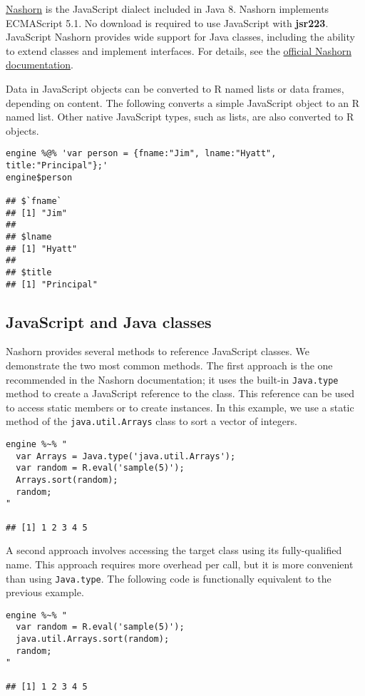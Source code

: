 \documentclass[
article,
11pt, %
a4paper, %
oneside, %
headinclude,footinclude, %
]{scrartcl}
\theoremstyle{definition} %
\theoremstyle{plain} %
\theoremstyle{remark} %
\newcommand{\pkg}[1]{\textbf{#1}}
\newcommand{\code}[1]{\texttt{#1}}
\begin{document}
\href{https://docs.oracle.com/javase/8/docs/technotes/guides/scripting/nashorn/}{Nashorn} is the JavaScript dialect included in Java 8. Nashorn implements ECMAScript 5.1. No download is required to use JavaScript with \pkg{jsr223}. JavaScript Nashorn provides wide support for Java classes, including the ability to extend classes and implement interfaces. For details, see the \href{https://docs.oracle.com/javase/8/docs/technotes/guides/scripting/nashorn/}{official Nashorn documentation}.

Data in JavaScript objects can be converted to R named lists or data frames, depending on content. The following converts a simple JavaScript object to an R named list. Other native JavaScript types, such as lists, are also converted to R objects.

\begin{verbatim}
engine %@% 'var person = {fname:"Jim", lname:"Hyatt", title:"Principal"};'
engine$person

## $`fname`
## [1] "Jim"
## 
## $lname
## [1] "Hyatt"
## 
## $title
## [1] "Principal"
\end{verbatim}

\subsection{JavaScript and Java classes}

Nashorn provides several methods to reference JavaScript classes. We demonstrate the two most common methods. The first approach is the one recommended in the Nashorn documentation; it uses the built-in \code{Java.type} method to create a JavaScript reference to the class. This reference can be used to access static members or to create instances. In this example, we use a static method of the \code{java.util.Arrays} class to sort a vector of integers.

\begin{verbatim}
engine %~% "
  var Arrays = Java.type('java.util.Arrays');
  var random = R.eval('sample(5)');
  Arrays.sort(random);
  random;
"

## [1] 1 2 3 4 5
\end{verbatim}

A second approach involves accessing the target class using its fully-qualified name. This approach requires more overhead per call, but it is more convenient than using \code{Java.type}. The following code is functionally equivalent to the previous example.

\begin{verbatim}
engine %~% "
  var random = R.eval('sample(5)');
  java.util.Arrays.sort(random);
  random;
"

## [1] 1 2 3 4 5
\end{verbatim}
\end{document}
